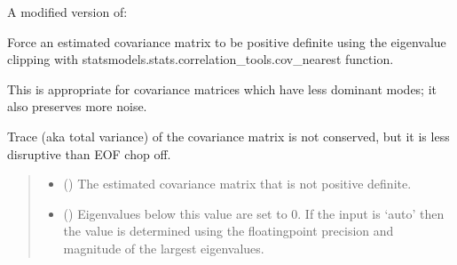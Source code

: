 \documentclass[letterpaper,10pt,english]{sphinxmanual}
\begin{document}
\begin{fulllineitems}
\label{\detokenize{misc:glomar_gridding.covariance_tools.simple_clipping}}
\pysigstartsignatures
\pysiglinewithargsret
{}
{\sphinxparamcomma {}\sphinxparamcomma {}}
{}
\pysigstopsignatures
\sphinxAtStartPar
A modified version of:

\sphinxAtStartPar
Force an estimated covariance matrix to be positive definite using the
eigenvalue clipping with statsmodels.stats.correlation\_tools.cov\_nearest
function.

\sphinxAtStartPar
This is appropriate for covariance matrices which have less dominant modes;
it also preserves more noise.

\sphinxAtStartPar
Trace (aka total variance) of the covariance matrix is not conserved,
but it is less disruptive than EOF chop off.
\begin{quote}\begin{description}
\begin{itemize}
\item {}
\sphinxAtStartPar
{} () \textendash{} The estimated covariance matrix that is not positive definite.

\item {}
\sphinxAtStartPar
{} (\sphinxstyleliteralemphasis{\sphinxupquote{ | }}) \textendash{} Eigenvalues below this value are set to 0. If the input is ‘auto’ then
the value is determined using the floating\sphinxhyphen{}point precision and magnitude
of the largest eigenvalues.

\end{itemize}

\sphinxAtStartPar
{}


\end{description}
\end{quote}
\end{fulllineitems}
\end{document}
